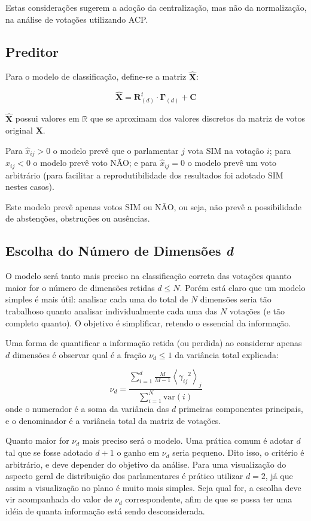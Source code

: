 \documentclass[a4paper, 12pt]{article}
\begin{document}
Estas considerações sugerem a adoção da centralização, mas não da normalização, na análise de votações utilizando ACP.

\subsection*{Preditor}

Para o modelo de classificação, define-se a matriz $\mathbf{\widehat{X}}$:

\begin{equation}
  \widehat{\mathbf{X}} = \mathbf{R}_{(d)}^{t} \cdot \mathbf{\Gamma}_{(d)} + \mathbf{C}
\end{equation}

$\widehat{\mathbf{X}}$ possui valores em $\mathbb{R}$ que se aproximam dos valores discretos da matriz de votos original $\mathbf{X}$.

Para $\widehat{x}_{ij} > 0$ o modelo prevê que o parlamentar $j$ vota SIM na votação $i$; para $\widehat{x}_{ij} < 0$ o modelo prevê voto NÃO; e para $\widehat{x}_{ij} = 0$ o modelo prevê um voto arbitrário (para facilitar a reprodutibilidade dos resultados foi adotado SIM nestes casos).

Este modelo prevê apenas votos SIM ou NÃO, ou seja, não prevê a possibilidade de abstenções, obstruções ou ausências.

\subsection*{Escolha do Número de Dimensões \emph{d}}

O modelo será tanto mais preciso na classificação correta das votações quanto maior for o número de dimensões retidas $d \leq N$. Porém está claro que um modelo simples é mais útil: analisar cada uma do total de $N$ dimensões seria tão trabalhoso quanto analisar individualmente cada uma das $N$ votações (e tão completo quanto). O objetivo é simplificar, retendo o essencial da informação.

Uma forma de quantificar a informação retida (ou perdida) ao considerar apenas $d$ dimensões é observar qual é a fração $\nu_d \leq 1$ da variância total explicada:

\[
\nu_d = \frac{\sum_{i=1}^{d}\frac{M}{M-1} \left< {\gamma_{ij}}^{2} \right>_j } {\sum_{i=1}^N \mathrm{var}(i)}
\]
onde o numerador é a soma da variância das $d$ primeiras componentes principais, e o denominador é a variância total da matriz de votações.

Quanto maior for $\nu_d$ mais preciso será o modelo. Uma prática comum é adotar $d$ tal que se fosse adotado $d+1$ o ganho em $\nu_d$ seria pequeno. Dito isso, o critério é arbitrário, e deve depender do objetivo da análise. Para uma visualização do aspecto geral de distribuição dos parlamentares é prático utilizar $d=2$, já que assim a visualização no plano é muito mais simples. Seja qual for, a escolha deve vir acompanhada do valor de $\nu_d$ correspondente, afim de que se possa ter uma idéia de quanta informação está sendo desconsiderada.
\end{document}
